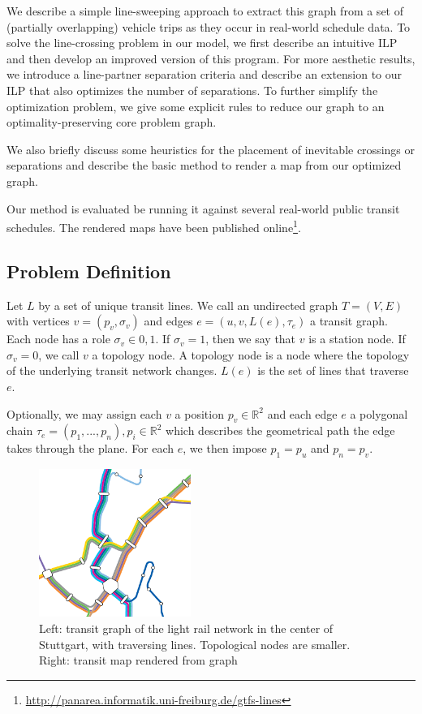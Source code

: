 \documentclass{llncs}
\begin{document}
We describe a simple line-sweeping approach to extract this graph from a set of (partially overlapping) vehicle trips as they occur in real-world schedule data. To solve the line-crossing problem in our model, we first describe an intuitive ILP and then develop an improved version of this program. For more aesthetic results, we introduce a line-partner separation criteria and describe an extension to our ILP that also optimizes the number of separations. To further simplify the optimization problem, we give some explicit rules to reduce our graph to an optimality-preserving core problem graph.

We also briefly discuss some heuristics for the placement of inevitable crossings or separations and describe the basic method to render a map from our optimized graph.

Our method is evaluated be running it against several real-world public transit schedules. The rendered maps have been published online\footnote{\url{http://panarea.informatik.uni-freiburg.de/gtfs-lines}}.


%
\subsection{Problem Definition}\label{SEC:def}
%
Let $L$ by a set of unique transit lines. We call an undirected graph $T = (V, E)$ with vertices $v = (p_v, \sigma_v)$ and edges $e = (u, v, L(e), \tau_e)$ a transit graph. Each node has a role $\sigma_v \in {0, 1}$. If $\sigma_v = 1$, then we say that $v$ is a station node. If $\sigma_v = 0$, we call $v$ a topology node. A topology node is a node where the topology of the underlying transit network changes. $L(e)$ is the set of lines that traverse $e$.

Optionally, we may assign each $v$ a position $p_v \in \mathbb{R}^2$ and each edge $e$ a polygonal chain $\tau_e = (p_1, ..., p_n), p_i \in \mathbb{R}^2$ which describes the geometrical path the edge takes through the plane. For each $e$, we then impose $p_1 = p_u$ and $p_n = p_v$.

\begin{figure}[t]
  \centering
	
	\hspace{.5cm}
    \includegraphics[trim={0cm 0 2.47cm 4.22cm},clip,width=0.44\textwidth]{render_examples/vvs_cropped.pdf}
	\caption{Left: transit graph of the light rail network in the center of Stuttgart, with traversing lines. Topological nodes are smaller. Right: transit map rendered from graph}
	\label{FIG:transitgraphvvs}
\end{figure}
\end{document}
